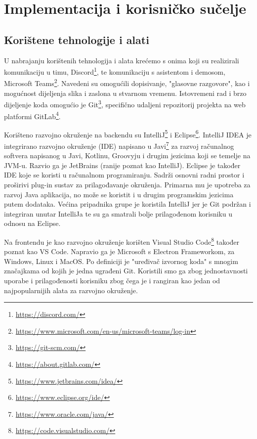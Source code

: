 \chapter{Implementacija i korisničko sučelje}
		
		
		\section{Korištene tehnologije i alati}
		
		\text U nabrajanju korištenih tehnologija i alata krećemo s onima koji su realizirali komunikaciju u timu, Discord\footnote{\url{https://discord.com/}}, te komunikaciju s asistentom i demosom, Microsoft Teams\footnote{\url{https://www.microsoft.com/en-us/microsoft-teams/log-in}}. Navedeni su omogućili dopisivanje, "glasovne razgovore", kao i mogućnost dijeljenja slika i zaslona u stvarnom vremenu.
        Istovremeni rad i brzo dijeljenje koda omogućio je Git\footnote{\url{https://git-scm.com/}}, specifično udaljeni repozitorij projekta na web platformi GitLab\footnote{\url{https://about.gitlab.com/}}.

        Korišteno razvojno okruženje na backendu su IntelliJ\footnote{\url{https://www.jetbrains.com/idea/}} i Eclipse\footnote{\url{https://www.eclipse.org/ide/}}. IntelliJ IDEA je integrirano razvojno okruženje (IDE) napisano u Javi\footnote{\url{https://www.oracle.com/java/}} za razvoj računalnog softvera napisanog u Javi, Kotlinu, Groovyju i drugim jezicima koji se temelje na JVM-u. Razvio ga je JetBrains (ranije poznat kao IntelliJ).
        Eclipse je također IDE koje se koristi u računalnom programiranju. Sadrži osnovni radni prostor i proširivi plug-in sustav za prilagođavanje okruženja. Primarna mu je upotreba za razvoj Java aplikacija, no može se koristit i u drugim programskim jezicima putem dodataka.
        Većina pripadnika grupe je koristila IntelliJ jer je Git podržan i integriran unutar IntelliJa te su ga smatrali bolje prilagođenom korisniku u odnosu na Eclipse.
        
        Na frontendu je kao razvojno okruženje korišten Visual Studio Code\footnote{\url{https://code.visualstudio.com/}} također poznat kao VS Code. Napravio ga je Microsoft s Electron Frameworkom, za Windows, Linux i MacOS. Po definiciji je "uređivač izvornog koda" s mnogim značajkama od kojih je jedna ugrađeni Git. Koristili smo ga zbog jednostavnosti uporabe i prilagođenosti korisniku zbog čega je i rangiran kao jedan od najpopularnijih alata za razvojno okruženje.

